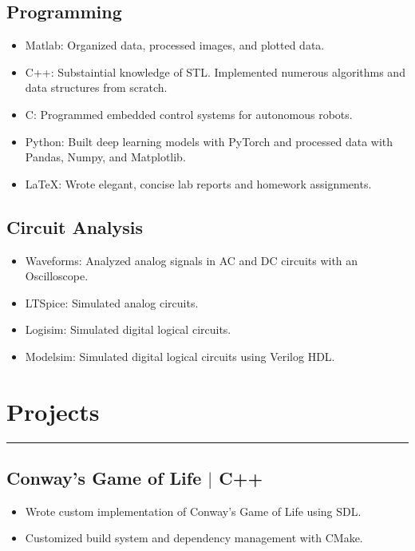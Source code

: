 \documentclass[10pt, letterpaper]{article}
\begin{document}
\subsection*{Programming}
\begin{itemize}[noitemsep]
	\item Matlab: Organized data, processed images, and plotted data.
	\item C++: Substaintial knowledge of STL. Implemented numerous algorithms and data structures from scratch.
	\item C: Programmed embedded control systems for autonomous robots.
	\item Python: Built deep learning models with PyTorch and processed data with Pandas, Numpy, and Matplotlib.
	\item \LaTeX: Wrote elegant, concise lab reports and homework assignments.
\end{itemize}

\subsection*{Circuit Analysis}
\begin{itemize}[noitemsep]
	\item Waveforms: Analyzed analog signals in AC and DC circuits with an Oscilloscope.	
	\item LTSpice: Simulated analog circuits.
	\item Logisim: Simulated digital logical circuits.
	\item Modelsim: Simulated digital logical circuits using Verilog HDL.
\end{itemize}

\section*{Projects}
\hrule
\vspace{7pt}

\subsection*{Conway's Game of Life $\vert$ C++}
\begin{itemize}[noitemsep]
	\item Wrote custom implementation of Conway's Game of Life using SDL.
	\item Customized build system and dependency management with CMake.
\end{itemize}
\end{document}
